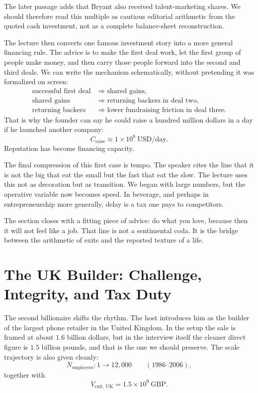 \begin{remark}
The later passage adds that Bryant also received talent-marketing shares. We should therefore read this multiple as cautious editorial arithmetic from the quoted cash investment, not as a complete balance-sheet reconstruction.
\end{remark}

The lecture then converts one famous investment story into a more general financing rule. The advice is to make the first deal work, let the first group of people make money, and then carry those people forward into the second and third deals. We can write the mechanism schematically, without pretending it was formalized on screen:
\begin{align}
\text{successful first deal} &\Longrightarrow \text{shared gains},\\
\text{shared gains} &\Longrightarrow \text{returning backers in deal two},\\
\text{returning backers} &\Longrightarrow \text{lower fundraising friction in deal three}.
\end{align}
That is why the founder can say he could raise a hundred million dollars in a day if he launched another company:
\begin{equation}
C_{\text{raise}} \approx 1 \times 10^{8}\ \mathrm{USD/day}.
\end{equation}
Reputation has become financing capacity.

The final compression of this first case is tempo. The speaker cites the line that it is not the big that eat the small but the fast that eat the slow. The lecture uses this not as decoration but as transition. We began with large numbers, but the operative variable now becomes speed. In beverage, and perhaps in entrepreneurship more generally, delay is a tax one pays to competitors.

The section closes with a fitting piece of advice: do what you love, because then it will not feel like a job. That line is not a sentimental coda. It is the bridge between the arithmetic of exits and the reported texture of a life.

\section{The UK Builder: Challenge, Integrity, and Tax Duty}

The second billionaire shifts the rhythm. The host introduces him as the builder of the largest phone retailer in the United Kingdom. In the setup the sale is framed at about \(1.6\) billion dollars, but in the interview itself the cleaner direct figure is \(1.5\) billion pounds, and that is the one we should preserve. The scale trajectory is also given cleanly:
\begin{equation}
N_{\text{employees}} : 1 \longrightarrow 12{,}000
\qquad (1986\text{--}2006),
\end{equation}
together with
\begin{equation}
V_{\text{exit, UK}} = 1.5 \times 10^{9}\ \mathrm{GBP}.
\end{equation}

